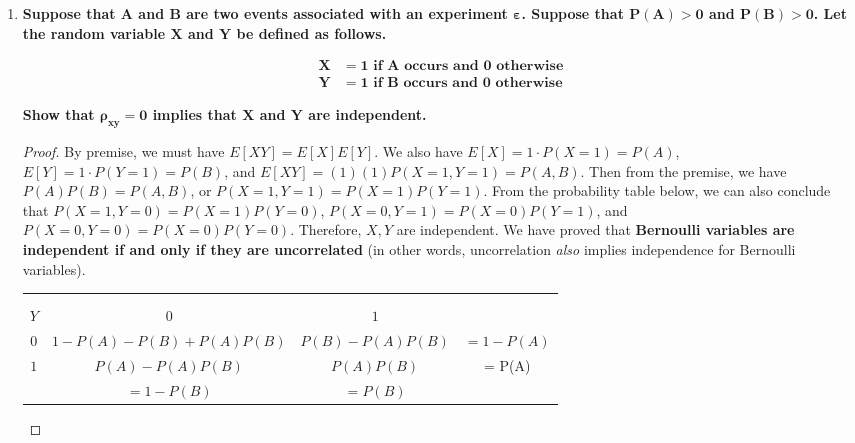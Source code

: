 \documentclass[10pt, oneside]{article}
\begin{document}
\begin{enumerate}[label=7.\arabic*]
\item  \begin{tcolorbox}[
  colback=Cerulean!5!white,
  colframe=Cerulean!75!black]
  \textbf{Suppose that $\bm{A}$ and $\bm{B}$ are two events associated with an experiment $\bm{\varepsilon}$. Suppose that $\bm{P(A) > 0}$ and $\bm{P(B) > 0}$. Let the random variable $\bm{X}$ and $\bm{Y}$ be defined as follows.}
  
  \begin{align*}
  \bm{X} &\bm{= 1} \textbf{ if } \bm{A} \textbf{ occurs and } \bm{0} \textbf{ otherwise} \\
  \bm{Y} &\bm{= 1} \textbf{ if } \bm{B} \textbf{ occurs and } \bm{0} \textbf{ otherwise} 
  \end{align*}
  
  \textbf{Show that $\bm{\rho_{xy} = 0}$ implies that $\bm{X}$ and $\bm{Y}$ are independent.}
  \end{tcolorbox}
  
  \begin{proof}
  By premise, we must have $E[XY] = E[X] E[Y]$. We also have $E[X] = 1 \cdot P(X = 1) = P(A)$, $E[Y] = 1 \cdot P(Y = 1) = P(B)$, and $E[XY] = (1)(1) P(X = 1, Y = 1) = P(A,B)$. Then from the premise, we have $P(A) P(B) = P(A,B)$, or $P(X = 1, Y = 1) = P(X = 1) P(Y = 1)$. From the probability table below, we can also conclude that $P(X = 1, Y = 0) = P(X = 1) P(Y = 0)$, $P(X = 0, Y = 1) = P(X = 0) P(Y = 1)$, and $P(X = 0, Y = 0) = P(X = 0) P(Y = 0)$. Therefore, $X, Y$ are independent. We have proved that \textbf{Bernoulli variables are independent if and only if they are uncorrelated} (in other words, uncorrelation \textit{also} implies independence for Bernoulli variables). 
  
\begin{center}
\begin{tabular}{|c | c | c | c |} 
 \hline
  \diagbox{$X$\\}{\\$Y$} & $0$ & $1$ & \\ 
 \hline\hline 
 $0$ & $1 - P(A) - P(B) + P(A)P(B)$ & $P(B) - P(A)P(B)$ & $= 1 - P(A)$ \\ 
 \hline
 $1$ & $P(A) - P(A)P(B)$ & $P(A)P(B)$ & = P(A) \\ 
 \hline
  & $= 1 - P(B)$ & $= P(B)$ & \\
  \hline
\end{tabular}
\end{center}
  
  \end{proof}
  

\end{enumerate}
\end{document}
